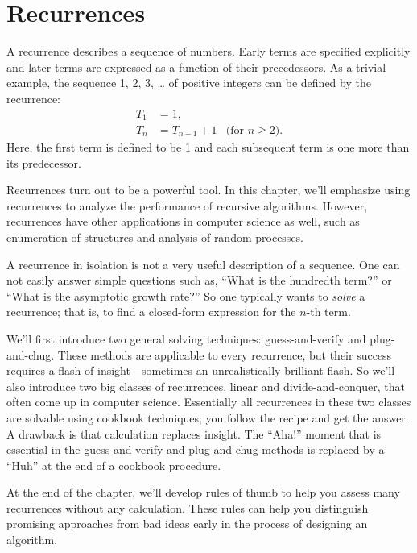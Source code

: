 \chapter{Recurrences}\label{chap:recurrences}


A recurrence describes a sequence of numbers.  Early terms are
specified explicitly and later terms are expressed as a function of
their precedessors.  As a trivial example, the sequence 1, 2, 3, \dots
of positive integers can be defined by the recurrence:
\begin{align*}
T_1 & = 1, \\
T_n & = T_{n-1} + 1 & \text{(for $n \geq 2$)}.
\end{align*}
Here, the first term is defined to be 1 and each subsequent term is
one more than its predecessor.

Recurrences turn out to be a powerful tool.  In this chapter, we'll
emphasize using recurrences to analyze the performance of recursive
algorithms.  However, recurrences have other applications in computer
science as well, such as enumeration of structures and analysis of
random processes.

A recurrence in isolation is not a very useful description of a
sequence.  One can not easily answer simple questions such as, ``What
is the hundredth term?'' or ``What is the asymptotic growth rate?''
So one typically wants to \emph{solve} a recurrence; that is, to find a
closed-form expression for the $n$-th term.

We'll first introduce two general solving techniques: guess-and-verify
and plug-and-chug.  These methods are applicable to every recurrence,
but their success requires a flash of insight---sometimes an
unrealistically brilliant flash.  So we'll also introduce two big
classes of recurrences, linear and divide-and-conquer, that often come
up in computer science.  Essentially all recurrences in these two
classes are solvable using cookbook techniques; you follow the recipe
and get the answer.  A drawback is that calculation replaces insight.
The ``Aha!''  moment that is essential in the guess-and-verify and
plug-and-chug methods is replaced by a ``Huh'' at the end of a
cookbook procedure.

At the end of the chapter, we'll develop rules of thumb to help you
assess many recurrences without any calculation.  These rules can help
you distinguish promising approaches from bad ideas early in the
process of designing an algorithm.

